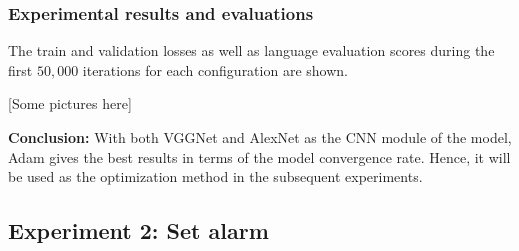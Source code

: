 \subsubsection{Experimental results and evaluations}

The train and validation losses as well as language evaluation scores during the first $50,000$ iterations for each configuration are shown. 


[Some pictures here]

\textbf{Conclusion:} With both VGGNet and AlexNet as the CNN module of the model, Adam gives the best results in terms of the model convergence rate. Hence, it will be used as the optimization method in the subsequent experiments.

\subsection{Experiment 2: Set alarm}
